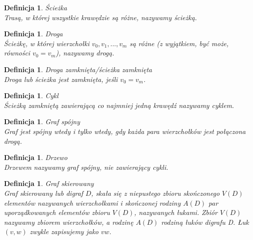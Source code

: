 \documentclass[12pt,a4paper]{report}
\newtheorem{definition}[theorem]{Definicja}
\begin{document}
\begin{definition}{Ścieżka \cite[Rozdział 3]{wilson2008}\\}
Trasą, w której wszystkie krawędzie są różne, nazywamy ścieżką.\\
\end{definition}

\begin{definition}{Droga \cite[Rozdział 3]{wilson2008}\\}
Ścieżkę, w której wierzchołki $v_{0}, v_{1}, ..., v_{m}$ są różne (z wyjątkiem, być może, równości $v_{0}=v_{m}$), nazywamy drogą. \\
\end{definition}

\begin{definition}{Droga zamknięta/ścieżka zamknięta \cite[Rozdział 3]{wilson2008}\\}
Droga lub ścieżka jest zamknięta, jeśli $v_{0}=v_{m}$.\\
\end{definition}

\begin{definition}{Cykl \cite[Rozdział 3]{wilson2008}\\}
Ścieżką zamkniętą zawierającą co najmniej jedną krawędź nazywamy cyklem. \\
\end{definition}

\begin{definition}{Graf spójny \cite[Rozdział 3]{wilson2008}\\}
Graf jest spójny wtedy i tylko wtedy, gdy każda para wierzchołków jest połączona drogą.\\
\end{definition}

\begin{definition}{Drzewo \cite[Rozdział 4]{wilson2008}\\}
Drzewem nazywamy graf spójny, nie zawierający cykli.\\
\end{definition}

\begin{definition}{Graf skierowany \cite[Rozdział 7]{wilson2008}\\}
Graf skierowany lub digraf $D$, skała się z niepustego zbioru skończonego $V(D)$ elementów nazywanych wierzchołkami i skończonej rodziny $A(D)$ par uporządkowanych elementów zbioru $V(D)$, nazywanych łukami. Zbiór $V(D)$ nazywamy zbiorem wierzchołków, a rodzinę $A(D)$ rodziną łuków digrafu D. Łuk $(v,w)$ zwykle zapisujemy jako $vw$.\\
\end{definition}
\end{document}
